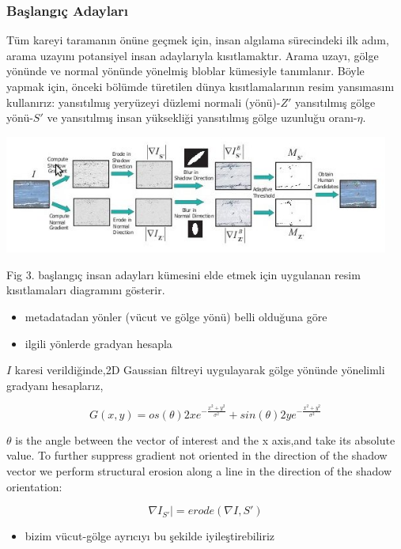 \documentclass{beamer}
\begin{document}
\begin{frame}[allowframebreaks]
	\frametitle{Başlangıç Adayları}

	Tüm kareyi taramanın önüne geçmek için, insan algılama sürecindeki ilk adım,
	arama uzayını potansiyel insan adaylarıyla kısıtlamaktır. Arama uzayı, gölge
	yönünde ve normal yönünde yönelmiş bloblar kümesiyle tanımlanır. Böyle
	yapmak için, önceki bölümde türetilen dünya kısıtlamalarının resim
	yansımasını kullanırız: yansıtılmış yeryüzeyi düzlemi normali (yönü)-$Z'$
	yansıtılmış gölge yönü-$S'$ ve yansıtılmış insan yüksekliği yansıtılmış
	gölge uzunluğu oranı-$\eta$.

	\includegraphics[width=0.95\textwidth]{img/fig3.jpg}\label{fig:baslangic-adaylari}

	Fig 3. başlangıç insan adayları kümesini elde etmek için uygulanan resim
	kısıtlamaları diagramını gösterir.

	\begin{itemize}
		\item metadatadan yönler (vücut ve gölge yönü) belli olduğuna göre
		\item ilgili yönlerde gradyan hesapla
	\end{itemize}

 	$I$ karesi verildiğinde,2D Gaussian filtreyi uygulayarak gölge yönünde
	yönelimli gradyanı hesaplarız,

   \begin{equation}
		G(x,y) = os(\theta) 2xe^{-\frac{x^2+y^2}{\sigma^2}} + sin(\theta)
		2ye^{-\frac{x^2+y^2}{\sigma^2}}
		\label{eq:gauss}
   \end{equation}

	$\theta$ is the angle between the vector of interest and the x axis,and take
	its absolute value. To further suppress gradient not oriented in the
	direction of the shadow vector we perform structural erosion along a line in
	the direction of the shadow orientation:

	\begin{equation}
		\nabla I_{S'}| = erode(\nabla I, S')
		\label{eq:shadow-orientation}
	\end{equation}

	\begin{itemize}
		\item bizim vücut-gölge ayrıcıyı bu şekilde iyileştirebiliriz
	\end{itemize}
\end{frame}
\end{document}
